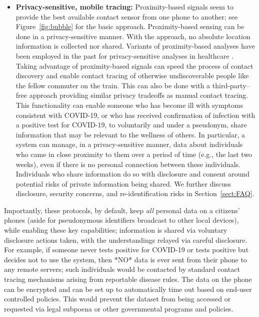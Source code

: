 \begin{itemize}
\item \textbf{Privacy-sensitive, mobile tracing:} Proximity-based signals seem to provide the best available contact sensor from one phone to another; see Figure~\ref{fig:bubble} for the basic approach. Proximity-based sensing can be done in a privacy-sensitive manner. With the approach, no absolute location information is collected nor shared. Variants of proximity-based analyses have been employed in the past for privacy-sensitive analyses in healthcare \cite{white2012}. Taking advantage of proximity-based signals can speed the process of contact discovery and enable contact tracing of otherwise undiscoverable people like the fellow commuter on the train.  This can also be done with a third-party--free approach providing similar privacy tradeoffs as manual contact tracing.  
This functionality can enable someone who has become ill with symptoms consistent with COVID-19, or who has received confirmation of infection with a positive test for COVID-19, to voluntarily and under a pseudonym, share information that may be relevant to the wellness of others.  In particular, a system can manage, in a privacy-sensitive manner, data about individuals who came in close proximity to them over a period of time (e.g., the last two weeks), even if there is no personal connection between these individuals.
 Individuals who share information do so with disclosure and consent around potential risks of private information being shared.  We further discuss disclosure, security concerns, and re-identification risks in Section~\ref{sect:FAQ}.
\end{itemize}



Importantly, these protocols, by default, keep \emph{all} personal data on a citizens' phones (aside for pseudonymous identifiers broadcast to other local devices), while enabling these key capabilities; information is shared via voluntary disclosure actions taken, with the understandings relayed via careful disclosure. For example, if someone never tests positive for COVID-19 or tests positive but decides not to use the system, then *NO* data is ever sent from their phone to any remote servers; such individuals
would be contacted by standard contact tracing mechanisms arising from reportable disease rules. The data on the phone can be encrypted and can be set up to automatically time out based on end-user controlled policies.  This would prevent the dataset from being accessed or requested via legal subpoena or other governmental programs and policies. 

